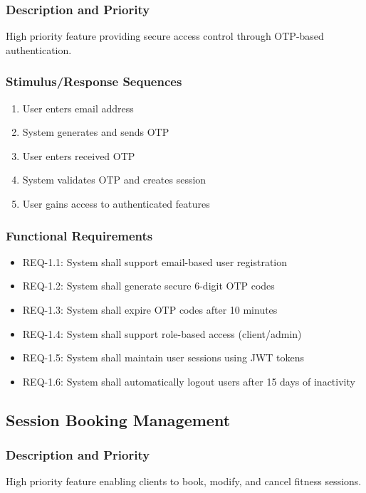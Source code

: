 \documentclass[12pt,a4paper]{article}
\begin{document}
\subsubsection{Description and Priority}
High priority feature providing secure access control through OTP-based authentication.

\subsubsection{Stimulus/Response Sequences}
\begin{enumerate}
    \item User enters email address
    \item System generates and sends OTP
    \item User enters received OTP
    \item System validates OTP and creates session
    \item User gains access to authenticated features
\end{enumerate}

\subsubsection{Functional Requirements}
\begin{itemize}
    \item REQ-1.1: System shall support email-based user registration
    \item REQ-1.2: System shall generate secure 6-digit OTP codes
    \item REQ-1.3: System shall expire OTP codes after 10 minutes
    \item REQ-1.4: System shall support role-based access (client/admin)
    \item REQ-1.5: System shall maintain user sessions using JWT tokens
    \item REQ-1.6: System shall automatically logout users after 15 days of inactivity
\end{itemize}

\subsection{Session Booking Management}
\subsubsection{Description and Priority}
High priority feature enabling clients to book, modify, and cancel fitness sessions.
\end{document}
